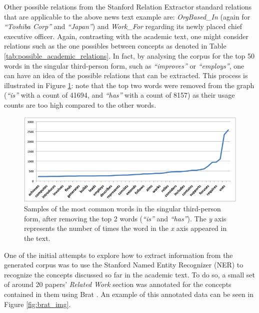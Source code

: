\documentclass[11pt,a4paper,openright]{memoir}
\begin{document}
Other possible relations from the Stanford Relation Extractor standard relations that are applicable to the above news text example are: \emph{OrgBased\_In} (again for \emph{\enquote{Toshiba Corp}} and \emph{\enquote{Japan}}) and \emph{Work\_For} regarding its newly placed chief executive officer. Again, contrasting with the academic text, one might consider relations such as the one possibles between concepts as denoted in Table \ref{tab:possible_academic_relations}. In fact, by analysing the corpus for the top 50 words in the singular third-person form, such as \emph{\enquote{improves}} or \emph{\enquote{employs}}, one can have an idea of the possible relations that can be extracted. This process is illustrated in Figure \ref{fig:words_most_use_no_top2}: note that the top two words were removed from the graph (\emph{\enquote{is}} with a count of 41694, and \emph{\enquote{has}} with a count of 8157) as their usage counts are too high compared to the other words.

\begin{figure}[!htbp]
  \centering
    \includegraphics[width=1.0\textwidth]{./images/words_most_use_no_top2}
  \caption[Samples of the most common words in the singular third-person form, after removing the top 2 words.]{Samples of the most common words in the singular third-person form, after removing the top 2 words (\emph{\enquote{is}} and \emph{\enquote{has}}). The \emph{y} axis represents the number of times the word in the \emph{x} axis appeared in the text.}
  \label{fig:words_most_use_no_top2}
\end{figure}

One of the initial attempts to explore how to extract information from the generated corpus was to use the Stanford Named Entity Recognizer (NER) to recognize the concepts discussed so far in the academic text. To do so, a small set of around 20 papers' \emph{Related Work} section was annotated for the concepts contained in them using Brat \cite{Stenetorp:2012:BWT:2380921.2380942}. An example of this annotated data can be seen in Figure \ref{fig:brat_img}.
\end{document}
